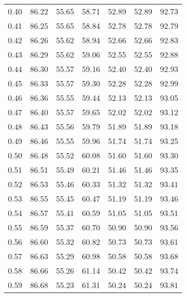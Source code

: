 \begin{tabular}{|c|c|c|c|c|c|c|}
      0.40 &     86.22 &     55.65 &      58.71 &   52.89 &      52.89 &         92.73 \\
      0.41 &     86.25 &     55.65 &      58.84 &   52.78 &      52.78 &         92.79 \\
      0.42 &     86.26 &     55.62 &      58.94 &   52.66 &      52.66 &         92.83 \\
      0.43 &     86.29 &     55.62 &      59.06 &   52.55 &      52.55 &         92.88 \\
      0.44 &     86.30 &     55.57 &      59.16 &   52.40 &      52.40 &         92.93 \\
      0.45 &     86.33 &     55.57 &      59.30 &   52.28 &      52.28 &         92.99 \\
      0.46 &     86.36 &     55.55 &      59.44 &   52.13 &      52.13 &         93.05 \\
      0.47 &     86.40 &     55.57 &      59.65 &   52.02 &      52.02 &         93.12 \\
      0.48 &     86.43 &     55.56 &      59.79 &   51.89 &      51.89 &         93.18 \\
      0.49 &     86.46 &     55.55 &      59.96 &   51.74 &      51.74 &         93.25 \\
      0.50 &     86.48 &     55.52 &      60.08 &   51.60 &      51.60 &         93.30 \\
      0.51 &     86.51 &     55.49 &      60.21 &   51.46 &      51.46 &         93.35 \\
      0.52 &     86.53 &     55.46 &      60.33 &   51.32 &      51.32 &         93.41 \\
      0.53 &     86.55 &     55.45 &      60.47 &   51.19 &      51.19 &         93.46 \\
      0.54 &     86.57 &     55.41 &      60.59 &   51.05 &      51.05 &         93.51 \\
      0.55 &     86.59 &     55.37 &      60.70 &   50.90 &      50.90 &         93.56 \\
      0.56 &     86.60 &     55.32 &      60.82 &   50.73 &      50.73 &         93.61 \\
      0.57 &     86.63 &     55.29 &      60.98 &   50.58 &      50.58 &         93.68 \\
      0.58 &     86.66 &     55.26 &      61.14 &   50.42 &      50.42 &         93.74 \\
      0.59 &     86.68 &     55.23 &      61.31 &   50.24 &      50.24 &         93.81 \\

\end{tabular}
